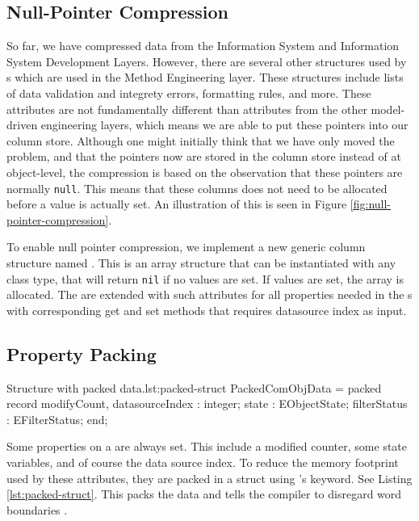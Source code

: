 \subsection{Null-Pointer Compression}
\label{sub:Null-Pointer Compression}
So far, we have compressed data from the Information System and Information System Development Layers. However, there are several other structures used by s which are used in the Method Engineering layer. These structures include lists of data validation and integrety errors, formatting rules, and more. These attributes are not fundamentally different than attributes from the other model-driven engineering layers, which means we are able to put these pointers into our column store. Although one might initially think that we have only moved the problem, and that the pointers now are stored in the column store instead of at object-level, the compression is based on the observation that these pointers are normally \texttt{null}. This means that these columns does not need to be allocated before a value is actually set. An illustration of this is seen in Figure \ref{fig:null-pointer-compression}.

To enable null pointer compression, we implement a new generic column structure named . This is an array structure that can be instantiated with any class type, that will return \texttt{nil} if no values are set. If values are set, the array is allocated. The  are extended with such attributes for all properties needed in the s with corresponding get and set methods that requires datasource index as input.

\subsection{Property Packing}
\label{sub:Property Packing}
\begin{delphicode}{Structure with packed data.}{lst:packed-struct}
PackedComObjData = packed record
    modifyCount,
    datasourceIndex    : integer; 
    state              : EObjectState;
    filterStatus       : EFilterStatus;
end;
\end{delphicode}
Some properties on a  are always set. This include a modified counter, some state variables, and of course the data source index. To reduce the memory footprint used by these attributes, they are packed in a struct using \delphi's  keyword. See Listing \ref{lst:packed-struct}. This packs the data and tells the compiler to disregard word boundaries \cite{noauthor_undated-vu}.

